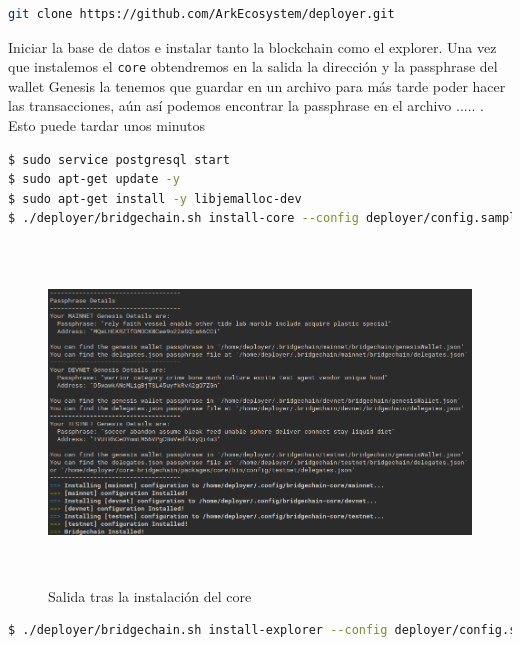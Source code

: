 \begin{lstlisting}[language=Bash,caption=Instalación Blockchain. Parte IX, label=cod:suma-cuerpo, style=Consola]
git clone https://github.com/ArkEcosystem/deployer.git
\end{lstlisting}

Iniciar la base de datos e instalar tanto la blockchain como el explorer. Una vez que instalemos el \texttt{core} obtendremos en la salida la dirección y la passphrase del wallet Genesis la tenemos que guardar en un archivo para más tarde poder hacer las transacciones, aún así podemos encontrar la passphrase en el archivo ..... . Esto puede tardar unos minutos
\begin{lstlisting}[language=Bash,caption=Instalación Blockchain. Parte X, label=cod:suma-cuerpo, style=Consola]
$ sudo service postgresql start
$ sudo apt-get update -y 
$ sudo apt-get install -y libjemalloc-dev
$ ./deployer/bridgechain.sh install-core --config deployer/config.sample.conf --autoinstall-deps --non-interactive
\end{lstlisting}

\begin{figure}[h]
	\centering
	\includegraphics[width=15cm,height=9cm]{figuras/Instalacion_bridgechain.png}
	\caption{Salida tras la instalación del core}
	\label{fig:gantt-real-1}
\end{figure}

\begin{lstlisting}[language=Bash,caption=Instalación Blockchain. Parte X, label=cod:suma-cuerpo, style=Consola]
$ ./deployer/bridgechain.sh install-explorer --config deployer/config.sample.conf --skip-deps --non-interactive
\end{lstlisting}



